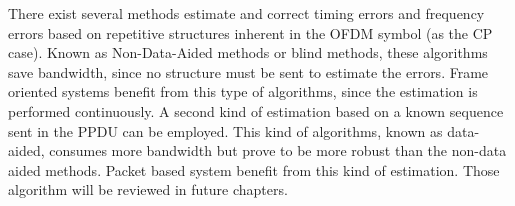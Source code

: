 There exist several methods estimate and correct timing errors and frequency errors based on repetitive structures inherent in the OFDM symbol (as the CP case). Known as Non-Data-Aided methods or blind methods, these algorithms save bandwidth, since no structure must be sent to estimate the errors. Frame oriented systems benefit from this type of algorithms, since the estimation is performed continuously. A second kind of estimation based on a known sequence sent in the PPDU can be employed. This kind of algorithms, known as data-aided, consumes more bandwidth but prove to be more robust than the non-data aided methods. Packet based system benefit from this kind of estimation. Those algorithm will be reviewed in future chapters. 










